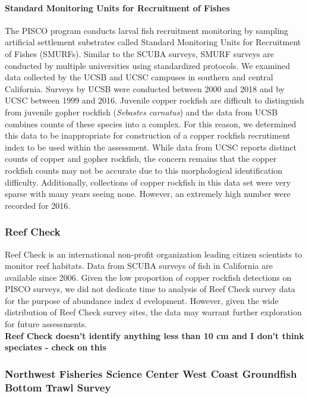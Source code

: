 \documentclass[11pt,
  english,
  letterpaper,
]{article}
\begin{document}
\hypertarget{standard-monitoring-units-for-recruitment-of-fishes}{%
\paragraph{Standard Monitoring Units for Recruitment of Fishes}\label{standard-monitoring-units-for-recruitment-of-fishes}}

The PISCO program conducts larval fish recruitment monitoring by sampling artificial settlement substrates called Standard Monitoring Units for Recruitment of Fishes (SMURFs). Similar to the SCUBA surveys, SMURF surveys are conducted by multiple universities using standardized protocols. We examined data collected by the UCSB and UCSC campuses in southern and central California. Surveys by UCSB were conducted between 2000 and 2018 and by UCSC between 1999 and 2016. Juvenile copper rockfish are difficult to distinguish from juvenile gopher rockfish (\emph{Sebastes carnatus}) and the data from UCSB combines counts of these species into a complex. For this reason, we determined this data to be inappropriate for construction of a copper rockfish recrutiment index to be used within the assessment. While data from UCSC reports distinct counts of copper and gopher rockfish, the concern remains that the copper rockfish counts may not be accurate due to this morphological identification difficulty. Additionally, collections of copper rockfish in this data set were very sparse with many years seeing none. However, an extremely high number were recorded for 2016.

\hypertarget{reef-check}{%
\subsubsection{Reef Check}\label{reef-check}}

Reef Check is an international non-profit organization leading citizen scientists to monitor reef habitats. Data from SCUBA surveys of fish in California are available since 2006. Given the low proportion of copper rockfish detections on PISCO surveys, we did not dedicate time to analysis of Reef Check survey data for the purpose of abundance index d evelopment. However, given the wide distribution of Reef Check survey sites, the data may warrant further exploration for future assessments.\\
\textbf{Reef Check doesn't identify anything less than 10 cm and I don't think speciates - check on this}

\hypertarget{northwest-fisheries-science-center-west-coast-groundfish-bottom-trawl-survey}{%
\subsubsection{Northwest Fisheries Science Center West Coast Groundfish Bottom Trawl Survey}\label{northwest-fisheries-science-center-west-coast-groundfish-bottom-trawl-survey}}
\end{document}
